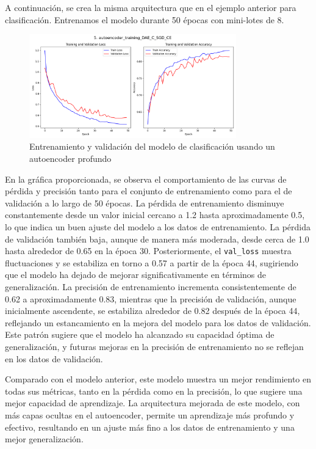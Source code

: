 A continuación, se crea la misma arquitectura que en el ejemplo anterior para clasificación. Entrenamos el modelo durante 50 épocas con mini-lotes de 8. 


\begin{figure}[H]
    \centering
    \includegraphics[width=0.8\textwidth]{img/daeMMC_sgd_ce.png}
    \caption{Entrenamiento y validación del modelo de clasificación usando un autoencoder profundo}
    \label{fig:dae_sgd_mse}
\end{figure}

En la gráfica proporcionada, se observa el comportamiento de las curvas de pérdida y precisión tanto para el conjunto de entrenamiento como para el de validación a lo largo de 50 épocas. La pérdida de entrenamiento disminuye constantemente desde un valor inicial cercano a 1.2 hasta aproximadamente 0.5, lo que indica un buen ajuste del modelo a los datos de entrenamiento. La pérdida de validación también baja, aunque de manera más moderada, desde cerca de 1.0 hasta alrededor de 0.65 en la época 30. Posteriormente, el \lstinline|val_loss| muestra fluctuaciones y se estabiliza en torno a 0.57 a partir de la época 44, sugiriendo que el modelo ha dejado de mejorar significativamente en términos de generalización. La precisión de entrenamiento incrementa consistentemente de 0.62 a aproximadamente 0.83, mientras que la precisión de validación, aunque inicialmente ascendente, se estabiliza alrededor de 0.82 después de la época 44, reflejando un estancamiento en la mejora del modelo para los datos de validación. Este patrón sugiere que el modelo ha alcanzado su capacidad óptima de generalización, y futuras mejoras en la precisión de entrenamiento no se reflejan en los datos de validación.

Comparado con el modelo anterior, este modelo muestra un mejor rendimiento en todas sus métricas, tanto en la pérdida como en la precisión, lo que sugiere una mejor capacidad de aprendizaje. La arquitectura mejorada de este modelo, con más capas ocultas en el autoencoder, permite un aprendizaje más profundo y efectivo, resultando en un ajuste más fino a los datos de entrenamiento y una mejor generalización.



